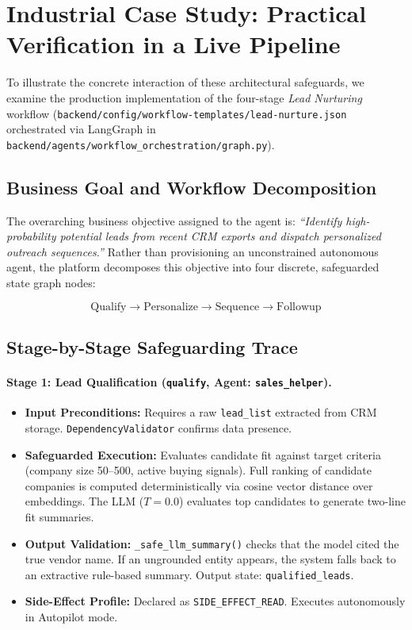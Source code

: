 \documentclass[10pt,a4paper,twocolumn]{article}
\begin{document}
\section{Industrial Case Study: Practical Verification in a Live Pipeline}
\label{sec:case}

To illustrate the concrete interaction of these architectural safeguards, we examine the production implementation of the four-stage \emph{Lead Nurturing} workflow (\texttt{backend/config/workflow-templates/lead-nurture.json} orchestrated via LangGraph in \texttt{backend/agents/workflow_orchestration/graph.py}).

\subsection{Business Goal and Workflow Decomposition}
The overarching business objective assigned to the agent is: \emph{``Identify high-probability potential leads from recent CRM exports and dispatch personalized outreach sequences.''} Rather than provisioning an unconstrained autonomous agent, the platform decomposes this objective into four discrete, safeguarded state graph nodes:

\begin{equation*}
\text{Qualify} \longrightarrow \text{Personalize} \longrightarrow \text{Sequence} \longrightarrow \text{Followup}
\end{equation*}

\subsection{Stage-by-Stage Safeguarding Trace}

\paragraph{Stage 1: Lead Qualification (\texttt{qualify}, Agent: \texttt{sales\_helper}).}
\begin{itemize}[leftmargin=*]
  \item \textbf{Input Preconditions:} Requires a raw \texttt{lead\_list} extracted from CRM storage. \texttt{DependencyValidator} confirms data presence.
  \item \textbf{Safeguarded Execution:} Evaluates candidate fit against target criteria (company size 50--500, active buying signals). Full ranking of candidate companies is computed deterministically via cosine vector distance over embeddings. The LLM ($T=0.0$) evaluates top candidates to generate two-line fit summaries.
  \item \textbf{Output Validation:} \texttt{\_safe\_llm\_summary()} checks that the model cited the true vendor name. If an ungrounded entity appears, the system falls back to an extractive rule-based summary. Output state: \texttt{qualified\_leads}.
  \item \textbf{Side-Effect Profile:} Declared as \texttt{SIDE\_EFFECT\_READ}. Executes autonomously in Autopilot mode.
\end{itemize}
\end{document}
